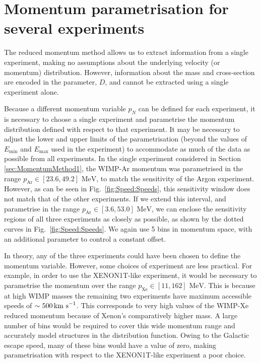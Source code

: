 \section{Momentum parametrisation for several experiments}
\label{sec:Speed:MomentumMethod2}

The reduced momentum method allows us to extract information from a single experiment, making no assumptions about the underlying velocity (or momentum) distribution. However, information about the mass and cross-section are encoded in the parameter, \(D\), and cannot be extracted using a single experiment alone.

Because a different momentum variable \(p_N\) can be defined for each experiment, it is necessary to choose a single experiment and parametrise the momentum distribution defined with respect to that experiment. It may be necessary to adjust the lower and upper limits of the parametrisation (beyond the values of \(E_\textrm{min}\) and \(E_\textrm{max}\) used in the experiment) to accommodate as much of the data as possible from all experiments. In the single experiment considered in Section \ref{sec:MomentumMethod1}, the WIMP-Ar momentum was parametrised in the range \(p_\textrm{Ar} \in \left[23.6, 49.2\right] \textrm{ MeV}\), to match the sensitivity of the Argon experiment. However, as can be seen in Fig.\ \ref{fig:Speed:Speeds}, this sensitivity window does not match that of the other experiments. If we extend this interval, and parametrise in the range \(p_\textrm{Ar} \in \left[3.6, 53.0\right] \textrm{ MeV}\), we can enclose the sensitivity regions of all three experiments as closely as possible, as shown by the dotted curves in Fig.\ \ref{fig:Speed:Speeds}. We again use 5 bins in momentum space, with an additional parameter to control a constant offset.

In theory, any of the three experiments could have been chosen to define the momentum variable. However, some choices of experiment are less practical. For example, in order to use the XENON1T-like experiment, it would be necessary to parametrise the momentum over the range \(p_\textrm{Xe} \in \left[11 , 162\right] \textrm{ MeV}\). This is because at high WIMP masses the remaining two experiments have maximum accessible speeds of \(\sim 500 \,\textrm{km s}^{-1}\). This corresponds to very high values of the WIMP-Xe reduced momentum because of Xenon's comparatively higher mass. A large number of bins would be required to cover this wide momentum range and accurately model structures in the distribution function. Owing to the Galactic escape speed, many of these bins would have a value of zero, making parametrisation with respect to the XENON1T-like experiment a poor choice.

